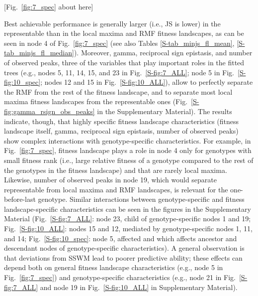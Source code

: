 \documentclass[a4paper,10pt]{article}
\begin{document}
[Fig.~\ref{fig:7_spec} about here]


Best achievable performance is generally larger (i.e., JS is lower) in the
representable than in the local maxima and RMF fitness landscapes, as can
be seen in node 4 of Fig.~\ref{fig:7_spec} (see also Tables
\ref{S-tab_minjs_fl_mean}, \ref{S-tab_minjs_fl_median}). Moreover, gamma,
reciprocal sign epistasis, and number of observed peaks, three of the
variables that play important roles in the fitted trees (e.g., nodes 5,
11, 14, 15, and 23 in Fig.~\ref{S-fig:7_ALL}; node 5 in
Fig.~\ref{S-fig:10_spec}; nodes 12 and 15 in Fig.~\ref{S-fig:10_ALL}),
allow to perfectly separate the RMF from the rest of the fitness
landscape, and to separate most local maxima fitness landscapes from the
representable ones (Fig.~\ref{S-fig:gamma_rsign_obs_peaks} in the
Supplementary Material). The results indicate, though, that highly
specific fitness landscape characteristics (fitness landscape itself,
gamma, reciprocal sign epistasis, number of observed peaks) show complex
interactions with genotype-specific characteristics. For example, in
Fig.~\ref{fig:7_spec}, fitness landscape plays a role in node 4 only for
genotypes with small fitness rank (i.e., large relative fitness of a
genotype compared to the rest of the genotypes in the fitness landscape)
and that are rarely local maxima. Likewise, number of observed peaks in
node 19, which would separate representable from local maxima and RMF
landscapes, is relevant for the one-before-last genotype. Similar
interactions between genotype-specific and fitness landscape-specific
characteristics can be seen in the figures in the Supplementary Material
(Fig.~\ref{S-fig:7_ALL}: node 23, child of genotype-specific nodes 1 and
19; Fig.~\ref{S-fig:10_ALL}: nodes 15 and 12, mediated by
genotype-specific nodes 1, 11, and 14; Fig.~\ref{S-fig:10_spec}: node 5,
affected and which affects ancestor and descendant nodes of
genotype-specific characteristics). A general observation is that deviations
from SSWM lead to poorer predictive ability; these effects can depend both on
general fitness landscape characteristics (e.g., node 5 in Fig.~\ref{fig:7_spec})
and genotype-specific characteristics (e.g., node 21 in Fig.~\ref{S-fig:7_ALL}
and node 19 in Fig.~\ref{S-fig:10_ALL} in Supplementary Material).
\end{document}
